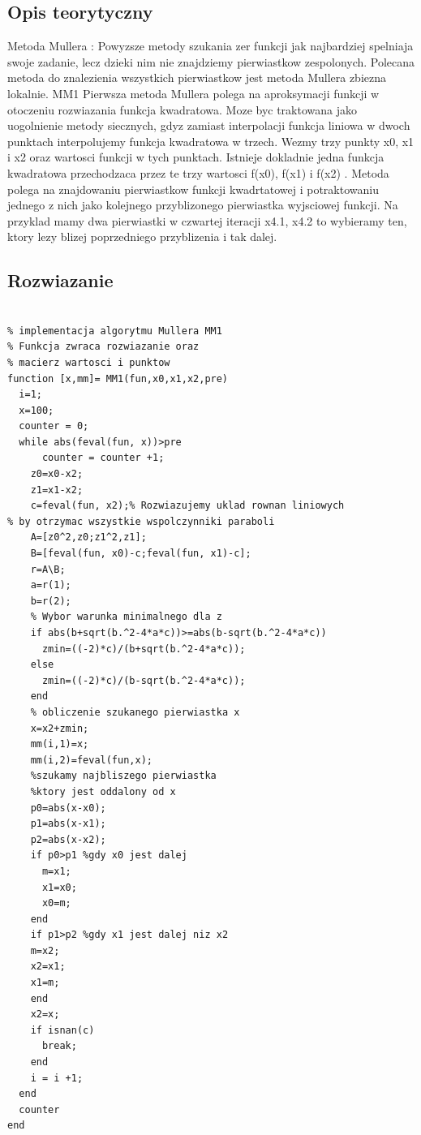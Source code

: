\documentclass[polish, 11pt, oneside]{article}   	%
\begin{document}
\subsection{Opis teorytyczny}

Metoda Mullera : Powyzsze metody szukania zer funkcji jak najbardziej
spelniaja swoje zadanie, lecz dzieki nim nie znajdziemy pierwiastkow zespolonych.
Polecana metoda do znalezienia wszystkich pierwiastkow jest metoda
Mullera zbiezna lokalnie.
MM1 Pierwsza metoda Mullera polega na aproksymacji funkcji w otoczeniu
rozwiazania funkcja kwadratowa. Moze byc traktowana jako uogolnienie
metody siecznych, gdyz zamiast interpolacji funkcja liniowa w dwoch punktach
interpolujemy funkcja kwadratowa w trzech.
Wezmy trzy punkty x0, x1 i x2 oraz wartosci funkcji w tych punktach. Istnieje
dokladnie jedna funkcja kwadratowa przechodzaca przez te trzy wartosci
f(x0), f(x1) i f(x2) . Metoda polega na znajdowaniu pierwiastkow funkcji
kwadrtatowej i potraktowaniu jednego z nich jako kolejnego przyblizonego
pierwiastka wyjsciowej funkcji. Na przyklad mamy dwa pierwiastki w czwartej
iteracji x4.1, x4.2 to wybieramy ten, ktory lezy blizej poprzedniego przyblizenia
i tak dalej.

\subsection{Rozwiazanie}

\begin{lstlisting}[caption=Implementacja funkcji MM1]

% implementacja algorytmu Mullera MM1
% Funkcja zwraca rozwiazanie oraz
% macierz wartosci i punktow 
function [x,mm]= MM1(fun,x0,x1,x2,pre)
  i=1;
  x=100;
  counter = 0;
  while abs(feval(fun, x))>pre
      counter = counter +1;
    z0=x0-x2;
    z1=x1-x2;
    c=feval(fun, x2);% Rozwiazujemy uklad rownan liniowych 
% by otrzymac wszystkie wspolczynniki paraboli
    A=[z0^2,z0;z1^2,z1];
    B=[feval(fun, x0)-c;feval(fun, x1)-c];
    r=A\B;
    a=r(1);
    b=r(2);
    % Wybor warunka minimalnego dla z
    if abs(b+sqrt(b.^2-4*a*c))>=abs(b-sqrt(b.^2-4*a*c)) 
      zmin=((-2)*c)/(b+sqrt(b.^2-4*a*c));
    else
      zmin=((-2)*c)/(b-sqrt(b.^2-4*a*c));
    end
    % obliczenie szukanego pierwiastka x
    x=x2+zmin;
    mm(i,1)=x;
    mm(i,2)=feval(fun,x);
    %szukamy najbliszego pierwiastka
    %ktory jest oddalony od x
    p0=abs(x-x0);
    p1=abs(x-x1);
    p2=abs(x-x2);
    if p0>p1 %gdy x0 jest dalej
      m=x1;
      x1=x0;
      x0=m;
    end
    if p1>p2 %gdy x1 jest dalej niz x2
    m=x2;
    x2=x1;
    x1=m;
    end
    x2=x;
    if isnan(c) 
      break;
    end
    i = i +1;
  end
  counter
end

\end{lstlisting}
\end{document}
